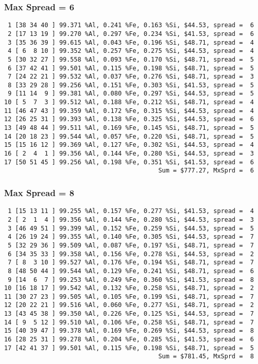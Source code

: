\documentclass{article}
\begin{document}
\subsubsection{Max Spread = 6}
\begin{verbatim}
 1 [38 34 40 ] 99.371 %Al, 0.241 %Fe, 0.163 %Si, $44.53, spread =  6
 2 [17 13 19 ] 99.270 %Al, 0.297 %Fe, 0.234 %Si, $41.53, spread =  6
 3 [35 36 39 ] 99.615 %Al, 0.043 %Fe, 0.196 %Si, $48.71, spread =  4
 4 [ 6  8 10 ] 99.352 %Al, 0.257 %Fe, 0.275 %Si, $44.53, spread =  4
 5 [30 32 27 ] 99.558 %Al, 0.093 %Fe, 0.170 %Si, $48.71, spread =  5
 6 [37 42 41 ] 99.501 %Al, 0.115 %Fe, 0.198 %Si, $48.71, spread =  5
 7 [24 22 21 ] 99.532 %Al, 0.037 %Fe, 0.276 %Si, $48.71, spread =  3
 8 [33 29 28 ] 99.256 %Al, 0.151 %Fe, 0.303 %Si, $41.53, spread =  5
 9 [11 14  9 ] 99.381 %Al, 0.080 %Fe, 0.297 %Si, $44.53, spread =  5
10 [ 5  7  3 ] 99.512 %Al, 0.188 %Fe, 0.212 %Si, $48.71, spread =  4
11 [46 47 43 ] 99.359 %Al, 0.172 %Fe, 0.315 %Si, $44.53, spread =  4
12 [26 25 31 ] 99.393 %Al, 0.138 %Fe, 0.325 %Si, $44.53, spread =  6
13 [49 48 44 ] 99.511 %Al, 0.169 %Fe, 0.145 %Si, $48.71, spread =  5
14 [20 18 23 ] 99.544 %Al, 0.057 %Fe, 0.220 %Si, $48.71, spread =  5
15 [15 16 12 ] 99.369 %Al, 0.127 %Fe, 0.302 %Si, $44.53, spread =  4
16 [ 2  4  1 ] 99.356 %Al, 0.144 %Fe, 0.280 %Si, $44.53, spread =  3
17 [50 51 45 ] 99.256 %Al, 0.198 %Fe, 0.351 %Si, $41.53, spread =  6
                                          Sum = $777.27, MxSprd =  6
\end{verbatim}

\subsubsection{Max Spread = 8}
\begin{verbatim}
 1 [15 13 11 ] 99.255 %Al, 0.157 %Fe, 0.277 %Si, $41.53, spread =  4
 2 [ 2  1  4 ] 99.356 %Al, 0.144 %Fe, 0.280 %Si, $44.53, spread =  3
 3 [46 49 51 ] 99.399 %Al, 0.152 %Fe, 0.259 %Si, $44.53, spread =  5
 4 [26 19 24 ] 99.355 %Al, 0.140 %Fe, 0.305 %Si, $44.53, spread =  7
 5 [32 29 36 ] 99.509 %Al, 0.087 %Fe, 0.197 %Si, $48.71, spread =  7
 6 [34 35 33 ] 99.358 %Al, 0.156 %Fe, 0.278 %Si, $44.53, spread =  2
 7 [ 8  3 10 ] 99.527 %Al, 0.176 %Fe, 0.194 %Si, $48.71, spread =  7
 8 [48 50 44 ] 99.544 %Al, 0.129 %Fe, 0.241 %Si, $48.71, spread =  6
 9 [14  6  7 ] 99.253 %Al, 0.249 %Fe, 0.360 %Si, $41.53, spread =  8
10 [16 18 17 ] 99.542 %Al, 0.132 %Fe, 0.258 %Si, $48.71, spread =  2
11 [30 27 23 ] 99.505 %Al, 0.105 %Fe, 0.199 %Si, $48.71, spread =  7
12 [20 22 21 ] 99.516 %Al, 0.060 %Fe, 0.277 %Si, $48.71, spread =  2
13 [43 45 38 ] 99.350 %Al, 0.226 %Fe, 0.125 %Si, $44.53, spread =  7
14 [ 9  5 12 ] 99.510 %Al, 0.106 %Fe, 0.258 %Si, $48.71, spread =  7
15 [40 39 47 ] 99.378 %Al, 0.169 %Fe, 0.269 %Si, $44.53, spread =  8
16 [28 25 31 ] 99.278 %Al, 0.204 %Fe, 0.285 %Si, $41.53, spread =  6
17 [42 41 37 ] 99.501 %Al, 0.115 %Fe, 0.198 %Si, $48.71, spread =  5
                                          Sum = $781.45, MxSprd =  8
\end{verbatim}
\end{document}
